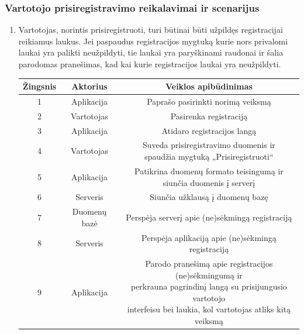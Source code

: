 \documentclass[12pt]{article}
\begin{document}
	\subsubsection{Vartotojo prisiregistravimo reikalavimai ir scenarijus}
	\begin{enumerate}
		\item Vartotojas, norintis prisiregistruoti, turi būtinai būti užpildęs registracijai reikiamus laukus. Jei paspaudus registracijos mygtuką kurie nors privalomi laukai yra palikti neužpildyti, tie laukai yra paryškinami raudonai ir šalia parodomas pranešimas, kad kai kurie registracijos laukai yra neužpildyti.
		
		\begin{center}
		\begin{tabular}{ | c | c | c | }
			\hline
			Žingsnis & Aktorius     & Veiklos apibūdinimas \\ \hline
			1        & Aplikacija   & Paprašo pasirinkti norimą veiksmą \\ \hline
			2        & Vartotojas   & Pasirenka registraciją \\ \hline
			3        & Aplikacija   & Atidaro registracijos langą \\ \hline
			4        & Vartotojas   & \makecell{Suveda prisiregistravimo duomenis ir \\ spaudžia mygtuką „Prisiregistruoti“} \\ \hline
			5        & Aplikacija   & \makecell{Patikrina duomenų formato teisingumą ir \\ siunčia duomenis į serverį} \\ \hline
			6        & Serveris     & Siunčia užklausą į duomenų bazę \\ \hline
			7        & Duomenų bazė & Perspėja serverį apie (ne)sėkmingą registraciją \\ \hline
			8        & Serveris     & Perspėja aplikaciją apie (ne)sėkmingą registraciją \\ \hline
			9        & Aplikacija   & \makecell{Parodo pranešimą apie registracijos (ne)sėkmingumą ir \\ perkrauna pagrindinį langą su prisijungusio vartotojo \\ interfeisu bei laukia, kol vartotojas atliks kitą veiksmą} \\ \hline
		\end{tabular}
		\end{center}	
		

\end{enumerate}
\end{document}
